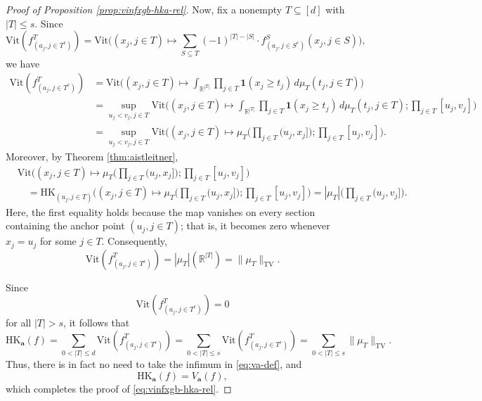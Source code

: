 \documentclass[10pt]{article}
\newcommand{\R}{{\mathbb R}}
\newcommand{\vit}{{\text{Vit}}}
\newcommand{\hk}{{\text{HK}}}
\newcommand{\abf}{{\mathbf{a}}}
\newcommand{\ind}{{\mathbf{1}}}
\begin{document}
\begin{proof}[Proof of Proposition \ref{prop:vinfxgb-hka-rel}]
Now, fix a nonempty $T \subseteq [d]$ with $|T| \le s$.
Since 
\begin{equation*}
    \vit(f^T_{(a_j, j \in T^c)}) 
    = \vit\Big((x_j, j \in T) \mapsto \sum_{S \subseteq T} (-1)^{|T| - |S|} 
    \cdot f^S_{(a_j, j \in S^c)}(x_j, j \in S)\Big),
\end{equation*}
we have
\begin{equation*}
\begin{aligned}
    \vit(f^T_{(a_j, j \in T^c)}) 
    &= \vit\Big((x_j, j \in T) \mapsto \int_{\R^{|T|}} 
    \prod_{j \in T} \ind(x_j \ge t_j) \, d\mu_T(t_j, j \in T)\Big) \\
    &= \sup_{u_j < v_j, j \in T} 
    \vit\Big((x_j, j \in T) \mapsto \int_{\R^{|T|}} 
    \prod_{j \in T} \ind(x_j \ge t_j) 
    \, d\mu_T(t_j, j \in T); 
    \prod_{j \in T} [u_j, v_j] \Big) \\
    &= \sup_{u_j < v_j, j \in T} 
    \vit\bigg((x_j, j \in T) \mapsto 
    \mu_T\Big(\prod_{j \in T} (u_j, x_j]\Big); 
    \prod_{j \in T} [u_j, v_j] \bigg).
\end{aligned}
\end{equation*}
Moreover, by Theorem \ref{thm:aistleitner}, 
\begin{equation*}
\begin{aligned}
    &\vit\bigg((x_j, j \in T) \mapsto 
    \mu_T\Big(\prod_{j \in T} (u_j, x_j]\Big); 
    \prod_{j \in T} [u_j, v_j] \bigg) \\
    &\quad= \hk_{(u_j, j \in T)}
    \bigg((x_j, j \in T) \mapsto 
    \mu_T\Big(\prod_{j \in T} (u_j, x_j]\Big); 
    \prod_{j \in T} [u_j, v_j] \bigg) 
    = |\mu_T|\Big(\prod_{j \in T} (u_j, v_j]\Big).
\end{aligned}
\end{equation*}
Here, the first equality holds because the map vanishes on every section 
containing the anchor point 
$(u_j, j \in T)$; that is, 
it becomes zero whenever $x_j = u_j$ for some $j \in T$. 
Consequently,
\begin{equation*}
    \vit(f^T_{(a_j, j \in T^c)}) = |\mu_T|(\R^{|T|}) 
    = \|\mu_T\|_{\text{TV}}.
\end{equation*}

Since 
\begin{equation*}
    \vit(f^T_{(a_j, j \in T^c)}) = 0
\end{equation*}
for all $|T| > s$, it follows that
\begin{equation*}
    \hk_{\abf}(f) 
    = \sum_{0 < |T| \le d} \vit(f^T_{(a_j, j \in T^c)})
    = \sum_{0 < |T| \le s} \vit(f^T_{(a_j, j \in T^c)})
    = \sum_{0 < |T| \le s} \|\mu_T\|_{\text{TV}}.
\end{equation*}
Thus, there is in fact no need to take the infimum in 
\eqref{eq:va-def}, and 
\begin{equation*}
    \hk_{\abf}(f) = V_{\abf}(f),
\end{equation*}
which completes the proof of \eqref{eq:vinfxgb-hka-rel}.


\end{proof}
\end{document}
